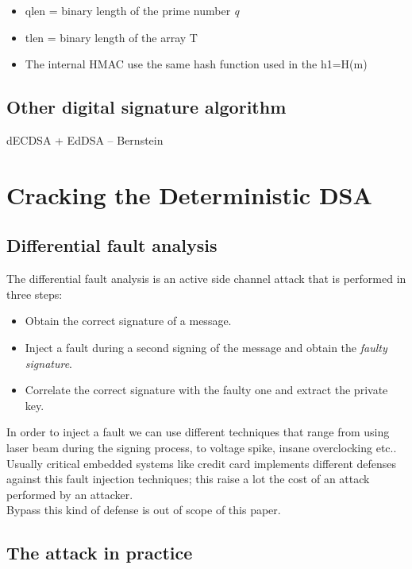 \documentclass[11pt,english]{article}
\begin{document}
\begin{itemize}
\item qlen = binary length of the prime number \textit{q}
\item tlen = binary length of the array T 
\item The internal HMAC use the same hash function used in the h1=H(m)
\end{itemize}

\subsection{Other digital signature algorithm}

dECDSA  + EdDSA -- Bernstein

\section{Cracking the Deterministic DSA}

\subsection{Differential fault analysis}

The differential fault analysis is an active side channel attack that is performed in three steps:
\begin{itemize}
\item Obtain the correct signature of a message.
\item Inject a fault during a second signing of the message and obtain the \textit{faulty signature}.
\item Correlate the correct signature with the faulty one and extract the private key.
\end{itemize}

In order to inject a fault we can use different techniques that range from using laser beam during the signing process, to voltage spike, insane overclocking etc..
\\Usually critical embedded systems like credit card implements different defenses against this fault injection techniques; this raise a lot the cost of an attack performed by an attacker. \\Bypass this kind of defense is out of scope of this paper.

\subsection{The attack in practice}
\end{document}
